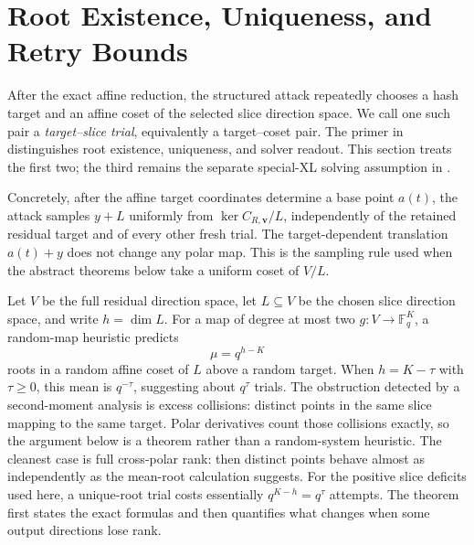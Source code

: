 \documentclass[11pt]{article}
\newcommand{\F}{\mathbb F}
\begin{document}
\section{Root Existence, Uniqueness, and Retry Bounds}\label{sec:slices}

After the exact affine reduction, the structured attack repeatedly chooses a
hash target and an affine coset of the selected slice direction space.  We call
one such pair a \emph{target--slice trial}, equivalently a target--coset pair.
The primer in  distinguishes root existence, uniqueness,
and solver readout.  This section treats the first two; the third remains the
separate special-XL solving assumption in .

Concretely, after the affine target coordinates determine a base point
$a(t)$, the attack samples $y+L$ uniformly from
$\ker C_{R,\mathbf v}/L$, independently of the retained residual target and
of every other fresh trial.  The target-dependent translation $a(t)+y$ does
not change any polar map.  This is the sampling rule used when the abstract
theorems below take a uniform coset of $V/L$.

Let $V$ be the full residual direction space, let $L\subseteq V$ be the chosen
slice direction space, and write $h=\dim L$.  For a map of degree at most two
$g:V\to\F_q^K$, a random-map heuristic predicts
\[
  \mu=q^{h-K}
\]
roots in a random affine coset of $L$ above a random target.  When $h=K-\tau$ with $\tau\ge0$, this mean is $q^{-\tau}$, suggesting
about $q^\tau$ trials.  The obstruction detected by a second-moment analysis is excess
collisions: distinct points in the same slice mapping to the same target.
Polar derivatives count those collisions exactly, so the argument below is a
theorem rather than a random-system heuristic.  The cleanest case is full
cross-polar rank: then distinct points behave almost as independently as the
mean-root calculation suggests.  For the positive slice deficits used here, a
unique-root trial costs essentially $q^{K-h}=q^\tau$ attempts.  The theorem first states the exact formulas and
then quantifies what changes when some output directions lose rank.
\end{document}
